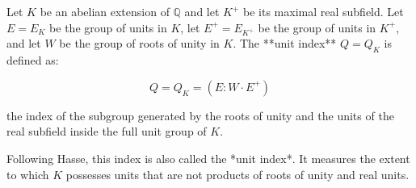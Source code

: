 Let $K$ be an abelian extension of $\mathbb{Q}$ and let $K^+$ be its maximal real subfield. Let $E = E_K$ be the group of units in $K$, let $E^+ = E_{K^+}$ be the group of units in $K^+$, and let $W$ be the group of roots of unity in $K$. The **unit index** $Q = Q_K$ is defined as:

$$Q = Q_K = (E : W \cdot E^+)$$

the index of the subgroup generated by the roots of unity and the units of the real subfield inside the full unit group of $K$.

Following Hasse, this index is also called the *unit index*. It measures the extent to which $K$ possesses units that are not products of roots of unity and real units.
